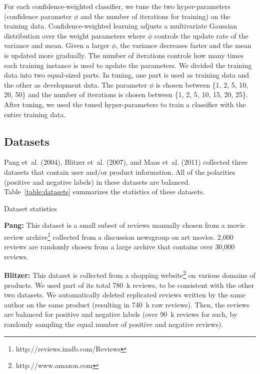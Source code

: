 \documentclass[english]{jnlp_1.4}
\begin{document}
For each confidence-weighted classifier, we tune the two hyper-parameters (confidence parameter $\phi$ and the number of iterations for training) on the training data.
Confidence-weighted learning adjusts a multivariate Gaussian distribution over the weight parameters where $\phi$ controls the update rate of the variance and mean.
Given a larger $\phi$, the variance decreases faster and the mean is updated more gradually.
The number of iterations controls how many times each training instance is used to update the parameters. 
We divided the training data into two equal-sized parts.
In tuning, one part is used as training data and the other as development data.
The parameter $\phi$ is chosen between \{1, 2, 5, 10, 20, 50\} and the number of iterations is chosen between \{1, 2, 5, 10, 15, 20, 25\}.
After tuning, we used the tuned hyper-parameters to train a classifier with the entire training data.


\subsection{Datasets}

Pang et~al. (2004), Blitzer et~al. (2007), and Maas et~al. (2011)  collected three datasets that contain user and/or product information. 
All of the polarities (positive and negative labels) in these datasets are balanced.
Table~\ref{table:datasets} summarizes the statistics of these datasets. 

\begin{table}[b]
\caption{ Dataset statistics}
\label{table:datasets}

\end{table}

\noindent
\textbf{Pang:}
This dataset is a small subset of reviews manually chosen from a movie review archive\footnote{http://reviews.imdb.com/Reviews} collected from a discussion newsgroup on art movies. 
2,000 reviews are randomly chosen from a large archive that contains over 30,000 reviews. 

\noindent
\textbf{Blitzer:}
This dataset is collected from a shopping website\footnote{http://www.amazon.com} on various domains of products.
We used part of its total 780~k reviews, to be consistent with the other two datasets. 
We automatically deleted replicated reviews written by the same author on the same product (resulting in 740~k raw reviews). 
Then, the reviews are balanced for positive and negative labels (over 90~k reviews for each, by randomly sampling the equal number of positive and negative reviews). 
\end{document}
